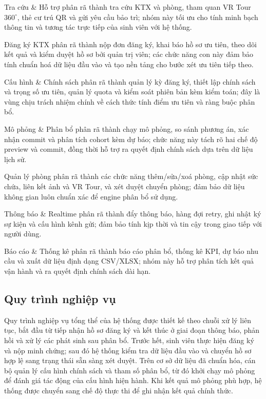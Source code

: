 \documentclass[../DoAn.tex]{subfiles}
\begin{document}
Tra cứu \& Hỗ trợ phân rã thành tra cứu KTX và phòng, tham quan VR Tour
$360^\circ$, thẻ cư trú QR và gửi yêu cầu bảo trì; nhóm này tối ưu cho tính
minh bạch thông tin và tương tác trực tiếp của sinh viên với hệ thống.

Đăng ký KTX phân rã thành nộp đơn đăng ký, khai báo hồ sơ ưu tiên, theo dõi
kết quả và kiểm duyệt hồ sơ bởi quản trị viên; các chức năng con này đảm bảo
tính chuẩn hoá dữ liệu đầu vào và tạo nền tảng cho bước xét ưu tiên tiếp theo.

Cấu hình \& Chính sách phân rã thành quản lý kỳ đăng ký, thiết lập chính sách
và trọng số ưu tiên, quản lý quota và kiểm soát phiên bản kèm kiểm toán; đây
là vùng chịu trách nhiệm chính về cách thức tính điểm ưu tiên và ràng buộc
phân bổ.

Mô phỏng \& Phân bổ phân rã thành chạy mô phỏng, so sánh phương án, xác nhận
commit và phân tích cohort kèm dự báo; chức năng này tách rõ hai chế độ preview
và commit, đồng thời hỗ trợ ra quyết định chính sách dựa trên dữ liệu lịch sử.

Quản lý phòng phân rã thành các chức năng thêm/sửa/xoá phòng, cập nhật sức
chứa, liên kết ảnh và VR Tour, và xét duyệt chuyển phòng; đảm bảo dữ liệu
không gian luôn chuẩn xác để engine phân bổ sử dụng.

Thông báo \& Realtime phân rã thành đẩy thông báo, hàng đợi retry, ghi nhật
ký sự kiện và cấu hình kênh gửi; đảm bảo tính kịp thời và tin cậy trong giao
tiếp với người dùng.

Báo cáo \& Thống kê phân rã thành báo cáo phân bổ, thống kê KPI, dự báo nhu
cầu và xuất dữ liệu định dạng CSV/XLSX; nhóm này hỗ trợ phân tích kết quả vận
hành và ra quyết định chính sách dài hạn.

\subsection{Quy trình nghiệp vụ}

Quy trình nghiệp vụ tổng thể của hệ thống được thiết kế theo chuỗi xử lý liên
tục, bắt đầu từ tiếp nhận hồ sơ đăng ký và kết thúc ở giai đoạn thông báo,
phản hồi và xử lý các phát sinh sau phân bổ. Trước hết, sinh viên thực hiện
đăng ký và nộp minh chứng; sau đó hệ thống kiểm tra dữ liệu đầu vào và chuyển
hồ sơ hợp lệ sang trạng thái sẵn sàng xét duyệt. Trên cơ sở dữ liệu đã chuẩn
hóa, cán bộ quản lý cấu hình chính sách và tham số phân bổ, từ đó khởi chạy
mô phỏng để đánh giá tác động của cấu hình hiện hành. Khi kết quả mô phỏng phù
hợp, hệ thống được chuyển sang chế độ thực thi để ghi nhận kết quả chính thức.
\end{document}
